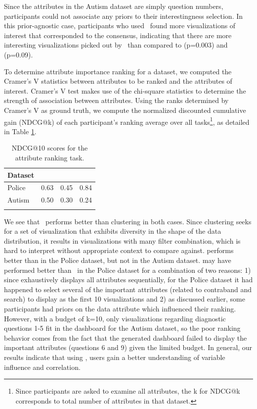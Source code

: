\par Since the attributes in the Autism dataset are simply question numbers, participants could not associate any priors to their interestingness selection. In this prior-agnostic case, participants who used \system\ found more visualizations of interest that corresponded to the consensus, indicating that there are more interesting visualizations picked out by \system\ than compared to \BFS (p=0.003) and \cluster (p=0.09).

To determine attribute importance ranking for a dataset, we computed the Cramer's V statistics between attributes to be ranked and the attributes of interest. Cramer's V test makes use of the chi-square statistics to determine the strength of association between attributes. Using the ranks determined by Cramer's V as ground truth, we compute the normalized discounted cumulative gain (NDCG@k) of each participant's ranking average over all tasks\footnote{Since participants are asked to examine all attributes, the k for NDCG@k corresponds to total number of attributes in that dataset.}, as detailed in Table \ref{table:ndcgRankingResult}.
\begin{table}[ht!]
	\centering
	\begin{tabular}{lrrr}
	\hline
	 Dataset   &   \system &   \cluster &   \BFS \\
	\hline
	 Police    &      0.63 &      0.45 &  0.84 \\
	 Autism    &      0.50 &      0.30 &  0.24 \\
	\hline
	\label{table:ndcg_ranking_result}
	\end{tabular}
	\caption{NDCG@10 scores for the attribute ranking task.}
	\vspace{-10pt}
    \label{table:ndcgRankingResult}
\end{table}
We see that \system\ performs better than clustering in both cases. Since clustering seeks for a set of visualization that exhibits diversity in the shape of the data distribution, it results in visualizations with many filter combination, which is hard to interpret without appropriate context to compare against. \BFS performs better than \system in the Police dataset, but not in the Autism dataset. \BFS may have performed better than \system\ in the Police dataset for a combination of two reasons: 1) since \BFS exhaustively displays all attributes sequentially, for the Police dataset it had happened to select several of the important attributes (related to contraband and search) to display as the first 10 visualizations and 2) as discussed earlier, some participants had priors on the data attribute which influenced their ranking. However, with a budget of k=10, only visualizations regarding diagnostic questions 1-5 fit in the dashboard for the Autism dataset, so the poor ranking behavior comes from the fact that the \BFS generated dashboard failed to display the important attributes (questions 6 and 9) given the limited budget. In general, our results indicate that using \system, users gain a better understanding of variable influence and correlation.

